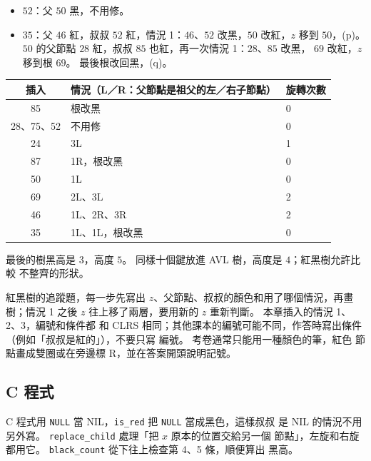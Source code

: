 \begin{itemize}
\item $52$：父 $50$ 黑，不用修。
\item $35$：父 $46$ 紅，叔叔 $52$ 紅，情況 1：$46$、$52$ 改黑，$50$ 改紅，$z$ 移到
$50$，(p)。 $50$ 的父節點 $28$ 紅，叔叔 $85$ 也紅，再一次情況 1：$28$、$85$ 改黑，
$69$ 改紅，$z$ 移到根 $69$。 最後根改回黑，(q)。
\end{itemize}

\begin{center}
\begin{tabular}{cll}
\toprule
插入 & 情況（L／R：父節點是祖父的左／右子節點） & 旋轉次數 \\
\midrule
85 & 根改黑 & 0 \\
28、75、52 & 不用修 & 0 \\
24 & 3L & 1 \\
87 & 1R，根改黑 & 0 \\
50 & 1L & 0 \\
69 & 2L、3L & 2 \\
46 & 1L、2R、3R & 2 \\
35 & 1L、1L，根改黑 & 0 \\
\bottomrule
\end{tabular}
\end{center}

最後的樹黑高是 $3$，高度 $5$。 同樣十個鍵放進 AVL 樹，高度是 $4$；紅黑樹允許比較
不整齊的形狀。

\begin{examnote}
紅黑樹的追蹤題，每一步先寫出 $z$、父節點、叔叔的顏色和用了哪個情況，再畫樹；情況
1 之後 $z$ 往上移了兩層，要用新的 $z$ 重新判斷。 本章插入的情況 1、2、3，編號和條件都
和 CLRS 相同；其他課本的編號可能不同，作答時寫出條件（例如「叔叔是紅的」），不要只寫
編號。 考卷通常只能用一種顏色的筆，紅色
節點畫成雙圈或在旁邊標 R，並在答案開頭說明記號。
\end{examnote}

\subsection{C 程式}
\label{sec:bal-rb-c}

C 程式用 \texttt{NULL} 當 NIL，\texttt{is\_red} 把 \texttt{NULL} 當成黑色，這樣叔叔
是 NIL 的情況不用另外寫。 \texttt{replace\_child} 處理「把 $x$ 原本的位置交給另一個
節點」，左旋和右旋都用它。 \texttt{black\_count} 從下往上檢查第 4、5 條，順便算出
黑高。

